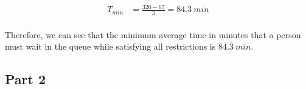 \begin{equation}
    \begin{aligned}
        T_{min} & =  \frac{320 - 67}{3} = 84.\overline{3}\ min
    \end{aligned}
\end{equation}

\paragraph{}
Therefore, we can see that the minimum average time in minutes that a person must wait in the queue while satisfying all restrictions is $84.\overline{3}\ min$.


\subsection{Part 2}
